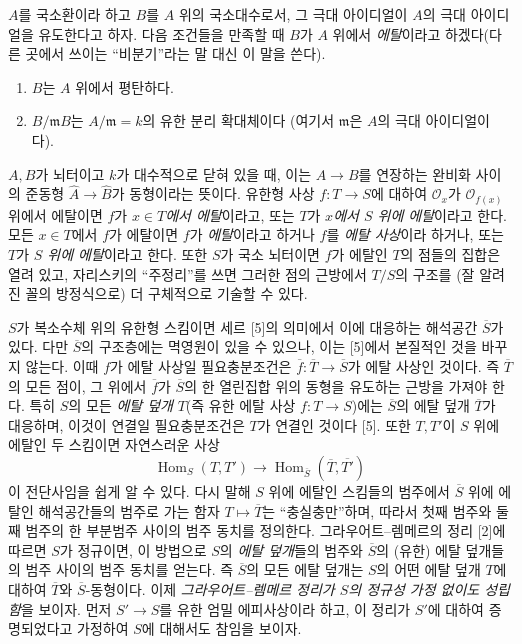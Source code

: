 $A$를 국소환이라 하고 $B$를 $A$ 위의 국소대수로서, 그 극대 아이디얼이
$A$의 극대 아이디얼을 유도한다고 하자. 다음 조건들을 만족할 때 $B$가
$A$ 위에서 \emph{에탈}이라고 하겠다(다른 곳에서 쓰이는 ``비분기''라는
말 대신 이 말을 쓴다).
\begin{enumerate}
\item[(i)] $B$는 $A$ 위에서 평탄하다.
\item[(ii)] $B/\mathfrak mB$는 $A/\mathfrak m=k$의 유한 분리 확대체이다
  (여기서 $\mathfrak m$은 $A$의 극대 아이디얼이다).
\end{enumerate}
$A,B$가 뇌터이고 $k$가 대수적으로 닫혀 있을 때, 이는
$A\longrightarrow B$를 연장하는 완비화 사이의 준동형
$\widehat A\longrightarrow\widehat B$가 동형이라는 뜻이다. 유한형 사상
$f:T\longrightarrow S$에 대하여 $\mathcal O_x$가
$\mathcal O_{f(x)}$ 위에서 에탈이면 $f$가 \emph{$x\in T$에서 에탈}이라고,
또는 $T$가 \emph{$x$에서 $S$ 위에 에탈}이라고 한다. 모든 $x\in T$에서
$f$가 에탈이면 $f$가 \emph{에탈}이라고 하거나 $f$를 \emph{에탈 사상}이라
하거나, 또는 $T$가 \emph{$S$ 위에 에탈}이라고 한다. 또한 $S$가 국소
뇌터이면 $f$가 에탈인 $T$의 점들의 집합은 열려 있고, 자리스키의
``주정리''를 쓰면 그러한 점의 근방에서 $T/S$의 구조를 (잘 알려진 꼴의
방정식으로) 더 구체적으로 기술할 수 있다.

$S$가 복소수체 위의 유한형 스킴이면 세르 [5]의 의미에서 이에 대응하는
해석공간 $\overline S$가 있다. 다만 $\overline S$의 구조층에는 멱영원이
있을 수 있으나, 이는 [5]에서 본질적인 것을 바꾸지 않는다. 이때 $f$가
에탈 사상일 필요충분조건은
$\overline f:\overline T\longrightarrow\overline S$가 에탈 사상인 것이다.
즉 $\overline T$의 모든 점이, 그 위에서 $\overline f$가 $\overline S$의 한
열린집합 위의 동형을 유도하는 근방을 가져야 한다. 특히 $S$의 모든
\emph{에탈 덮개} $T$(즉 유한 에탈 사상 $f:T\longrightarrow S$)에는
$\overline S$의 에탈 덮개 $\overline T$가 대응하며, 이것이 연결일
필요충분조건은 $T$가 연결인 것이다 [5]. 또한 $T,T'$이 $S$ 위에 에탈인
두 스킴이면 자연스러운 사상
\[
  \operatorname{Hom}_S(T,T')\longrightarrow
  \operatorname{Hom}_{\overline S}(\overline T,\overline{T'})
\]
이 전단사임을 쉽게 알 수 있다. 다시 말해 $S$ 위에 에탈인 스킴들의
범주에서 $\overline S$ 위에 에탈인 해석공간들의 범주로 가는 함자
$T\longmapsto\overline T$는 ``충실충만''하며, 따라서 첫째 범주와 둘째
범주의 한 부분범주 사이의 범주 동치를 정의한다. 그라우어트--렘메르의
정리 [2]에 따르면 $S$가 정규이면, 이 방법으로 $S$의 \emph{에탈 덮개}들의
범주와 $\overline S$의 (유한) 에탈 덮개들의 범주 사이의 범주 동치를
얻는다. 즉 $\overline S$의 모든 에탈 덮개는 $S$의 어떤 에탈 덮개 $T$에
대하여 $\overline T$와 $\overline S$-동형이다. 이제 \emph{그라우어트--렘메르
정리가 $S$의 정규성 가정 없이도 성립함}을 보이자. 먼저
$S'\longrightarrow S$를 유한 엄밀 에피사상이라 하고, 이 정리가 $S'$에
대하여 증명되었다고 가정하여 $S$에 대해서도 참임을 보이자.

